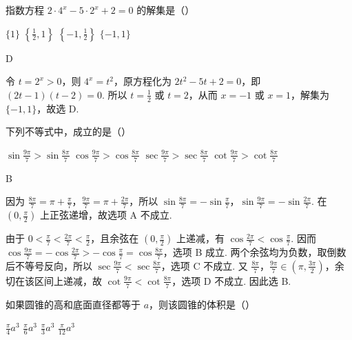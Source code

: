\documentclass[UTF8,a4paper,oneside,11pt]{ctexbook}
\begin{document}
\begin{problem}
指数方程 \(2\cdot4^{x}-5\cdot2^{x}+2=0\) 的解集是（\quad）

\choices
{\(\{1\}\)}
{\(\left\{\frac12,1\right\}\)}
{\(\left\{-1,\frac12\right\}\)}
{\(\{-1,1\}\)}
\end{problem}

\begin{answer}D\end{answer}

\begin{solution}
令 \(t=2^{x}>0\)，则 \(4^{x}=t^{2}\)，原方程化为 \(2t^{2}-5t+2=0\)，即 \((2t-1)(t-2)=0\). 所以 \(t=\frac12\) 或 \(t=2\)，从而 \(x=-1\) 或 \(x=1\)，解集为 \(\{-1,1\}\)，故选 D.
\end{solution}

\begin{problem}
下列不等式中，成立的是（\quad）

\choices
{\(\sin\frac{9\pi}{7}>\sin\frac{8\pi}{7}\)}
{\(\cos\frac{9\pi}{7}>\cos\frac{8\pi}{7}\)}
{\(\sec\frac{9\pi}{7}>\sec\frac{8\pi}{7}\)}
{\(\cot\frac{9\pi}{7}>\cot\frac{8\pi}{7}\)}
\end{problem}

\begin{answer}B\end{answer}

\begin{solution}
因为 \(\frac{8\pi}{7}=\pi+\frac\pi7\)，\(\frac{9\pi}{7}=\pi+\frac{2\pi}{7}\)，所以 \(\sin\frac{8\pi}{7}=-\sin\frac\pi7\)，\(\sin\frac{9\pi}{7}=-\sin\frac{2\pi}{7}\). 在 \(\left(0,\frac\pi2\right)\) 上正弦递增，故选项 A 不成立.

由于 \(0<\frac\pi7<\frac{2\pi}{7}<\frac\pi2\)，且余弦在 \(\left(0,\frac\pi2\right)\) 上递减，有 \(\cos\frac{2\pi}{7}<\cos\frac\pi7\). 因而
\(\cos\frac{9\pi}{7}=-\cos\frac{2\pi}{7}>-\cos\frac\pi7=\cos\frac{8\pi}{7}\)，选项 B 成立. 两个余弦均为负数，取倒数后不等号反向，所以 \(\sec\frac{9\pi}{7}<\sec\frac{8\pi}{7}\)，选项 C 不成立. 又 \(\frac{8\pi}{7}\)，\(\frac{9\pi}{7}\in\left(\pi,\frac{3\pi}{2}\right)\)，余切在该区间上递减，故 \(\cot\frac{9\pi}{7}<\cot\frac{8\pi}{7}\)，选项 D 不成立. 因此选 B.
\end{solution}

\begin{problem}
如果圆锥的高和底面直径都等于 \(a\)，则该圆锥的体积是（\quad）

\choices
{\(\frac{\pi}{4}a^{3}\)}
{\(\frac{\pi}{6}a^{3}\)}
{\(\frac{\pi}{3}a^{3}\)}
{\(\frac{\pi}{12}a^{3}\)}
\end{problem}
\end{document}
